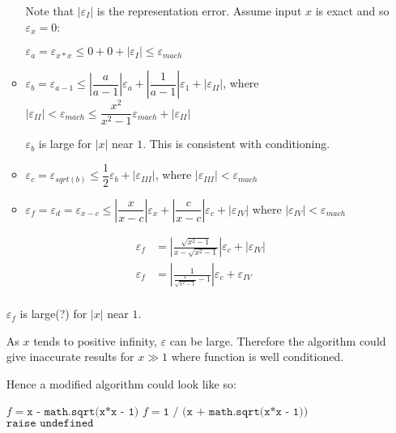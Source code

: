 \begin{example}
\begin{enumerate}
\begin{itemize}
                        Note that \( |\varepsilon_I| \) is the representation error. Assume input \( x \) is exact and so \( \varepsilon_x = 0 \):

                        \( \varepsilon_a = \varepsilon_{x*x} \le 0 + 0 + |\varepsilon_I| \le \varepsilon_{mach} \)

                  \item \( \varepsilon_b = \varepsilon_{a-1} \le \left| \dfrac{a}{a-1} \right| \varepsilon_a + \left| \dfrac{1}{a-1} \right| \varepsilon_1 + |\varepsilon_{II}| \), where \( |\varepsilon_{II}| < \varepsilon_{mach} \le \dfrac{x^2}{x^2 - 1} \varepsilon_{mach} + |\varepsilon_{II}| \)

                        \( \varepsilon_b \) is large for \( |x| \) near \( 1 \). This is consistent with conditioning.

                  \item \( \varepsilon_c = \varepsilon_{sqrt(b)} \le \dfrac{1}{2} \varepsilon_b + |\varepsilon_{III}| \), where \( |\varepsilon_{III}| < \varepsilon_{mach} \)

                  \item \( \varepsilon_f = \varepsilon_d = \varepsilon_{x - c} \le \left| \dfrac{x}{x - c} \right| \varepsilon_x + \left| \dfrac{c}{x - c} \right| \varepsilon_c + |\varepsilon_{IV}| \) where \( |\varepsilon_{IV}| < \varepsilon_{mach} \)
              \end{itemize}
              \begin{align*}
                  \varepsilon_f
                   & = \left| \frac{\sqrt{x^2 - 1}}{x - \sqrt{x^2 - 1}} \right| \varepsilon_c + |\varepsilon_{IV}|
                  \\
                  \varepsilon_f
                   & = \left| \frac{1}{\frac{x}{\sqrt{x^2 - 1}} - 1} \right| \varepsilon_c + \varepsilon_{IV}
                  \\
              \end{align*}

              \( \varepsilon_f \) is large(?) for \( |x| \) near \( 1 \).

              As \( x \) tends to positive infinity, \( \varepsilon \) can be large. Therefore the algorithm could give inaccurate results for \( x \gg 1 \) where function is well conditioned.

              Hence a modified algorithm could look like so:
              \begin{algorithm}[H]
                  \begin{algorithmic}
                      \State \( f = \texttt{x - math.sqrt(x*x - 1)} \)
                      \State \( f = \texttt{1 / (x + math.sqrt(x*x - 1))} \)
                      \Else
                      \State \(\texttt{raise undefined} \)
                      \EndIf
                      \EndFunction
                  \end{algorithmic}
              \end{algorithm}
    \end{enumerate}
\end{example}